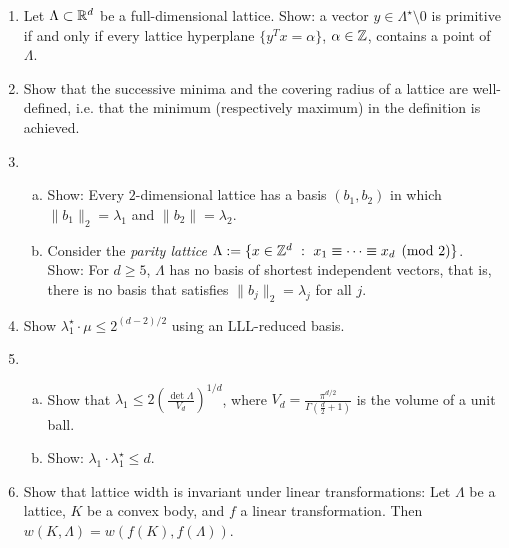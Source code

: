 \begin{enumerate}
  \item
    Let $\Lambda \subset \mathbb{R}^d$ be a full-dimensional lattice.
    Show: a vector $y \in \Lambda^\star \setminus 0$ is primitive
    if and only if
    every lattice hyperplane $\{ y^T x = \alpha\}$, $\alpha \in \mathbb{Z}$, contains a point of $\Lambda$.

  \item
    Show that the successive minima and the covering radius of a lattice are well-defined,
    i.e. that the minimum (respectively maximum) in the definition is achieved.

  \item
    \begin{enumerate}[(a)]
    \item Show: Every $2$-dimensional lattice has a basis $(b_1, b_2)$
      in which $\|b_1\|_2 = \lambda_1$ and $\|b_2\| = \lambda_2$.

    \item
      Consider the \emph{parity lattice}
      $\Lambda := \{ x \in \mathbb{Z}^d ~:~ x_1 \equiv \dots \equiv x_d \pmod{2} \}$.
      Show: For $d \geq 5$, $\Lambda$ has no basis of shortest independent vectors,
      that is, there is no basis that satisfies $\|b_j\|_2 = \lambda_j$ for all $j$.
    \end{enumerate}

  \item
    Show $\lambda_1^\star \cdot \mu \leq 2^{(d-2)/2}$ using an LLL-reduced basis.

  \item
    \begin{enumerate}[(a)]
      \item Show that
        $\lambda_1 \leq 2 \left( \frac{\det \Lambda}{V_d} \right)^{1/d}$,
        where $V_d = \frac{\pi^{d/2}}{\Gamma(\frac{d}{2} + 1)}$ is the volume of a unit ball.

      \item Show: $\lambda_1 \cdot \lambda_1^\star \leq d$.
    \end{enumerate}

  \item
    Show that lattice width is invariant under linear transformations:
    Let $\Lambda$ be a lattice, $K$ be a convex body, and $f$ a linear transformation.
    Then $w(K, \Lambda) = w(f(K), f(\Lambda))$.

\end{enumerate}

